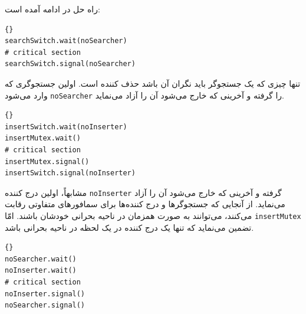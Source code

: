 \documentclass{book}
\begin{document}
    راه حل در ادامه آمده است: 

\begin{latin}
\begin{latin}
\begin{lstlisting}[title={راه حل جستجو-درج-حذف (جستجوگر)}]{}
searchSwitch.wait(noSearcher)
# critical section
searchSwitch.signal(noSearcher)
\end{lstlisting}
\end{latin}
\end{latin}

    تنها چیزی که یک جستجوگر باید نگران آن باشد حذف کننده است. 
    اولین جستجوگری که وارد می‌شود {\tt noSearcher} را گرفته و آخرینی که خارج می‌شود آن را آزاد می‌نماید. 

\begin{latin}
\begin{latin}
\begin{lstlisting}[title={راه حل جستجو-درج-حذف (درج‌کننده)}]{}
insertSwitch.wait(noInserter)
insertMutex.wait()
# critical section
insertMutex.signal()
insertSwitch.signal(noInserter)
\end{lstlisting}
\end{latin}
\end{latin}


    مشابهاً، اولین درج کننده {\tt noInserter} گرفته و آخرینی که خارج می‌شود آن را آزاد می‌نماید.
    از آنجایی که جستجوگرها و درج کننده‌ها برای سمافورهای متفاوتی رقابت می‌کنند، می‌توانند به صورت همزمان در ناحیه بحرانی خودشان 
    باشند. امّا {\tt insertMutex} تضمین می‌نماید که تنها یک درج کننده در یک لحظه‌ در ناحیه بحرانی باشد. 

\begin{latin}
\begin{latin}
\begin{lstlisting}[title={راه حل جستجو-درج-حذف (حذف کننده)}]{}
noSearcher.wait()
noInserter.wait()
# critical section
noInserter.signal()
noSearcher.signal()

\end{lstlisting}
\end{latin}
\end{latin}
\end{document}
